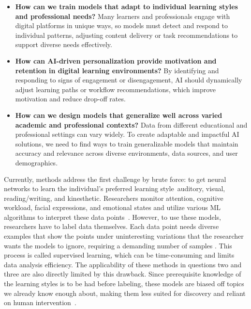 \documentclass{article}
\begin{document}
\begin{itemize}
    \item \textbf{How can we train models that adapt to individual learning styles and professional needs?} \newline 
    Many learners and professionals engage with digital platforms in unique ways, so models must detect and respond to 
    individual patterns, adjusting content delivery or task recommendations to support diverse needs effectively. 
    \item \textbf{How can AI-driven personalization provide motivation and retention in digital learning environments?} \newline 
    By identifying and responding to signs of engagement or disengagement, AI should dynamically adjust learning paths or 
    workflow recommendations, which improve motivation and reduce drop-off rates. 
    \item \textbf{How can we design models that generalize well across varied academic and professional contexts?} \newline 
    Data from different educational and professional settings can vary widely. To create adaptable and impactful AI 
    solutions, we need to find ways to train generalizable models that maintain accuracy and relevance across diverse environments, 
    data sources, and user demographics. 
\end{itemize}

\indent Currently, methods address the first challenge by brute force: to get neural networks to learn the individual's preferred learning 
style\textemdash~auditory, visual, reading/writing, and kinesthetic. Researchers monitor attention, cognitive workload, facial expressions, 
and emotional states and utilize various ML algorithms to interpret these data 
points~\cite{An-AI-based-learning-style-prediction-model-for-personalized-and-effective-learning}. However, to use these models, researchers 
have to label data themselves. Each data point needs diverse examples that show the points under uninteresting variations that the researcher 
wants the models to ignore, requiring a demanding number of samples \cite{Deep-learning-is-combined-with-massive-scale-citizen-science}. This 
process is called supervised learning, which can be time-consuming and limits data analysis efficiency. The applicability of these methods in 
questions two and three are also directly limited by this drawback. Since prerequisite knowledge of the learning styles is to be had before 
labeling, these models are biased off topics we already know enough about, making them less suited for discovery and reliant on human 
intervention~\cite{Supervised-learning-with-decision-tree-based-methods-in-computational-and-systems-biology}.
\end{document}
